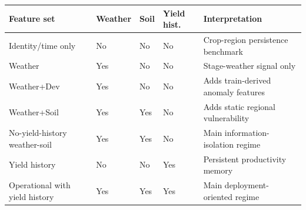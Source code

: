 \begin{tabular}{lllll}
\toprule
Feature set & Weather & Soil & Yield hist. & Interpretation \\
\midrule
Identity/time only & No & No & No & Crop-region persistence benchmark \\
Weather & Yes & No & No & Stage-weather signal only \\
Weather+Dev & Yes & No & No & Adds train-derived anomaly features \\
Weather+Soil & Yes & Yes & No & Adds static regional vulnerability \\
No-yield-history weather-soil & Yes & Yes & No & Main information-isolation regime \\
Yield history & No & No & Yes & Persistent productivity memory \\
Operational with yield history & Yes & Yes & Yes & Main deployment-oriented regime \\
\bottomrule
\end{tabular}
